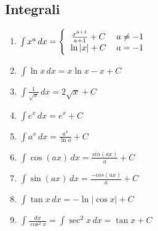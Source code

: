 \subsection{Integrali}
\begin{center}
	\begin{small}
		\begin{enumerate}
			\item \begin{math}
				      \int x^a\,dx =
				      \Bigg\{\begin{tabular}{ccc}
					      $\frac{x^{a+1}}{a+1} + C$  & $a \neq -1$ & \\
					      $ \ln{\left|x\right|} + C$ & $a = -1$    & \\
				      \end{tabular}
			      \end{math}
			\item \begin{math}
				      \int \ln {x}\,dx = x \ln {x} - x + C
			      \end{math}
			\item \begin{math}
				      \int \frac {1}{\sqrt{x}}\,dx=2\sqrt{x} + C
			      \end{math}
			\item \begin{math}
				      \int e^x\,dx = e^x + C
			      \end{math}
			\item \begin{math}
				      \int a^x\,dx = \frac{a^x}{\ln{a}} + C
			      \end{math}
			\item \begin{math}
				      \int \cos({ax}) \, dx = { \frac{sin (ax)}{a} } + C
			      \end{math}
			\item \begin{math}
				      \int \sin({ax}) \, dx = { \frac{-cos(ax)}{a} } + C
			      \end{math}
			\item \begin{math}
				      \int \tan{x} \, dx = -\ln{\left| \cos {x} \right|} + C
			      \end{math}
			\item \begin{math}
				      \int \frac{dx}{\cos^2 x}=\int \sec^2 x \, dx = \tan x + C
			      \end{math}

\end{enumerate}
\end{small}
\end{center}
